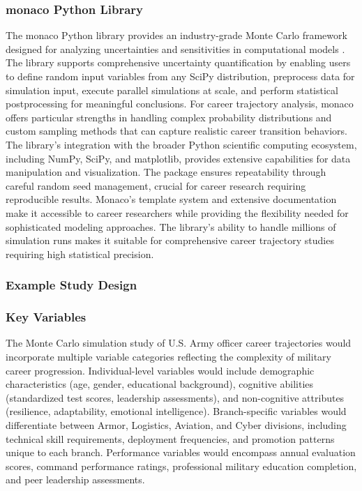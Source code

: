 \documentclass[main.tex]{subfiles}
\begin{document}
\subsubsection{monaco Python Library}

The monaco Python library provides an industry-grade Monte Carlo framework designed for analyzing uncertainties and sensitivities in computational models \parencite{monaco2025}. The library supports comprehensive uncertainty quantification by enabling users to define random input variables from any SciPy distribution, preprocess data for simulation input, execute parallel simulations at scale, and perform statistical postprocessing for meaningful conclusions. For career trajectory analysis, monaco offers particular strengths in handling complex probability distributions and custom sampling methods that can capture realistic career transition behaviors. The library's integration with the broader Python scientific computing ecosystem, including NumPy, SciPy, and matplotlib, provides extensive capabilities for data manipulation and visualization. The package ensures repeatability through careful random seed management, crucial for career research requiring reproducible results. Monaco's template system and extensive documentation make it accessible to career researchers while providing the flexibility needed for sophisticated modeling approaches. The library's ability to handle millions of simulation runs makes it suitable for comprehensive career trajectory studies requiring high statistical precision.

\subsubsection{Example Study Design}

\subsubsection{Key Variables}

The Monte Carlo simulation study of U.S. Army officer career trajectories would incorporate multiple variable categories reflecting the complexity of military career progression. Individual-level variables would include demographic characteristics (age, gender, educational background), cognitive abilities (standardized test scores, leadership assessments), and non-cognitive attributes (resilience, adaptability, emotional intelligence). Branch-specific variables would differentiate between Armor, Logistics, Aviation, and Cyber divisions, including technical skill requirements, deployment frequencies, and promotion patterns unique to each branch. Performance variables would encompass annual evaluation scores, command performance ratings, professional military education completion, and peer leadership assessments.
\end{document}
